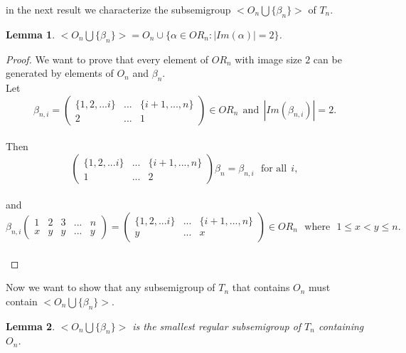 \documentclass[10pt]{extarticle}
\numberwithin{equation}{section}
\numberwithin{bbb}{section}
\newtheorem{lemma}{Lemma}[section]
\numberwithin{equation}{section}
\begin{document}
\newpage
in the next result we characterize the subsemigroup $<O_n \bigcup \{\beta_n\}>$ of $T_n$.
\begin{lemma}
    $<O_n \bigcup \{\beta_n\}>=O_n \cup \{\alpha \in OR_n: |Im(\alpha)|=2\}$.
\end{lemma}
\begin{proof}
  We want to prove that every element of $OR_n$ with image size $2$ can be generated by elements of $O_n$ and $\beta_n$.\\[10pt]
  Let 
  $$\beta_{n,i}=\begin{pmatrix}  \{1,2,...i\}&...&\{i+1,...,n\}\\2&...&1
  \end{pmatrix} \in OR_n \ \ \text{and} \ \ |Im(\beta_{n,i})|=2.$$\\[10pt]
  Then 
  $$\begin{pmatrix}  \{1,2,...i\}&...&\{i+1,...,n\}\\1&...&2
  \end{pmatrix}\beta_n=\beta_{n,i}  \ \ \ \text{for all} \ \ i,$$\\[10pt]
  and  
  $$\beta_{n,i}\begin{pmatrix}  1&2&3&...&n\\x&y&y&...&y
  \end{pmatrix}=\begin{pmatrix}  \{1,2,...i\}&...&\{i+1,...,n\}\\y&...&x
  \end{pmatrix} \in OR_n \ \ \  \text{where} \ \ \  1\leq x<y\leq n.$$\\
\end{proof}

Now we want to show that any subsemigroup of $T_n$ that contains $O_n$ must contain $<O_n \bigcup \{\beta_n\}>$.

\vspace{0.5cm}
\begin{lemma}
$<O_n \bigcup \{\beta_n\}>$ is the smallest regular subsemigroup of $T_n$ containing $O_n$.
\end{lemma}
\end{document}
